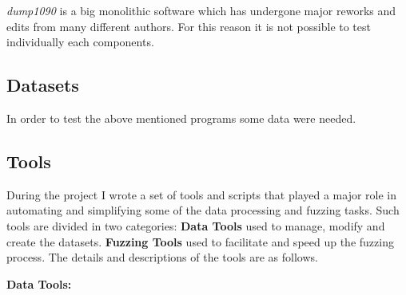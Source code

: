 \documentclass[../main.tex]{subfiles}
\begin{document}
\emph{dump1090} is a big monolithic software which has undergone major reworks and edits from many different authors. For this reason it is not possible to test individually each components.

\subsection{Datasets}

In order to test the above mentioned programs some data were needed.

\subsection{Tools}
\label{sec:tools}

During the project I wrote a set of tools and scripts that played a major role
in automating and simplifying some of the data processing and fuzzing tasks.
Such tools are divided in two categories: \textbf{Data Tools} used to manage,
modify and create the datasets. \textbf{Fuzzing Tools} used to facilitate and
speed up the fuzzing process. The details and descriptions of the tools are as
follows.
\bigskip

\textbf{Data Tools:}
\end{document}
